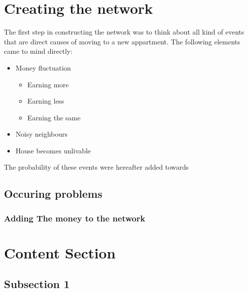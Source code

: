 \documentclass[12pt]{article} %
\begin{document}
\section{Creating the network} %


The first step in constructing the network was to think about all kind of events
that are direct causes of moving to a new appartment. The following elements
came to mind directly:

\begin{itemize}
    \item Money fluctuation
        \begin{itemize}
            \item Earning more
            \item Earning less
            \item Earning the same
        \end{itemize}
    \item Noisy neighbours
    \item House becomes unlivable
\end{itemize}

The probability of these events were hereafter added towards


\subsection{Occuring problems} %




\subsubsection{ Adding The money to the network} 



\section{Content Section} %



\subsection{Subsection 1} %
\end{document}
